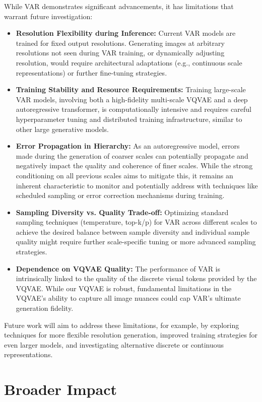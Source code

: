 \documentclass{article}
\begin{document}
While VAR demonstrates significant advancements, it has limitations that warrant future investigation:
\begin{itemize}[leftmargin=*,itemsep=1pt,topsep=2pt]
    \item \textbf{Resolution Flexibility during Inference:} Current VAR models are trained for fixed output resolutions. Generating images at arbitrary resolutions not seen during VAR training, or dynamically adjusting resolution, would require architectural adaptations (e.g., continuous scale representations) or further fine-tuning strategies.
    \item \textbf{Training Stability and Resource Requirements:} Training large-scale VAR models, involving both a high-fidelity multi-scale VQVAE and a deep autoregressive transformer, is computationally intensive and requires careful hyperparameter tuning and distributed training infrastructure, similar to other large generative models.
    \item \textbf{Error Propagation in Hierarchy:} As an autoregressive model, errors made during the generation of coarser scales can potentially propagate and negatively impact the quality and coherence of finer scales. While the strong conditioning on all previous scales aims to mitigate this, it remains an inherent characteristic to monitor and potentially address with techniques like scheduled sampling or error correction mechanisms during training.
    \item \textbf{Sampling Diversity vs. Quality Trade-off:} Optimizing standard sampling techniques (temperature, top-k/p) for VAR across different scales to achieve the desired balance between sample diversity and individual sample quality might require further scale-specific tuning or more advanced sampling strategies.
    \item \textbf{Dependence on VQVAE Quality:} The performance of VAR is intrinsically linked to the quality of the discrete visual tokens provided by the VQVAE. While our VQVAE is robust, fundamental limitations in the VQVAE's ability to capture all image nuances could cap VAR's ultimate generation fidelity.
\end{itemize}
Future work will aim to address these limitations, for example, by exploring techniques for more flexible resolution generation, improved training strategies for even larger models, and investigating alternative discrete or continuous representations.

\section{Broader Impact}
\label{sec:broader_impact}
\end{document}

